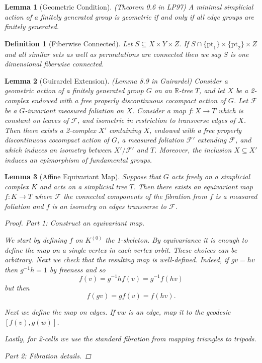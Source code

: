 \documentclass{article}
\theoremstyle{mystyle}
\newtheorem{lem}{Lemma}[section]
\newtheorem{defn}{Definition}
\theoremstyle{remark}
\begin{document}
\begin{lem}
    [Geometric Condition]
    \label{lem:simpgeo} 
    (Theorem 0.6 in LP97)
    A minimal simplicial action of a finitely generated group is geometric if and only if all edge groups are finitely generated.
\end{lem}
\begin{defn}
    [Fiberwise Connected]
    \label{def:connfibers} 
    Let \(S \subseteq X \times Y \times Z\). If \(S \cap \{\text{pt}_1\} \times \{\text{pt}_2\} \times Z\) and all similar sets as well as permutations are connected then we say \(S\) is one dimensional fiberwise connected.
\end{defn}
\begin{lem}
    [Guirardel Extension]
    \label{lem:guirardel-extension}
    (Lemma 8.9 in Guirardel)
    Consider a geometric action of a finitely generated group \(G\) on an \(\mathbb{R}\)-tree \(T\), and let \(X\) be a 2-complex endowed with a free properly discontinuous cocompact action of \(G\). Let \(\mathscr{F}\) be a \(G\)-invariant measured foliation on \(X\). Consider a map \(f: X \to T\) which is constant on leaves of \(\mathscr{F}\), and isometric in restriction to transverse edges of \(X\). Then there exists a 2-complex \( X'\) containing \(X\), endowed with a free properly discontinuous cocompact action of \(G\), a measured foliation \(\mathscr{F} '\) extending \(\mathscr{F}\), and which induces an isometry between \(X'/ \mathscr{F}'\) and \(T\). Moreover, the inclusion \(X \subseteq X'\) induces an epimorphism of fundamental groups.
\end{lem}
\begin{lem}
    [Affine Equivariant Map]
    \label{lem:affineequivariantmap} 
    Suppose that \(G\) acts freely on a simplicial complex \(K\) and acts on a simplicial tree \(T\). Then there exists an equivariant map \(f: K \to T\) where \(\mathscr{F}\) the connected components of the fibration from \(f\) is a measured foliation and \(f\) is an isometry on edges transverse to \(\mathscr{F}\).
    \begin{proof}
        Part 1: Construct an equivariant map.

        We start by defining \(f\) on \(K^{(0)}\) the 1-skeleton. By equivariance it is enough to define the map on a single vertex in each vertex orbit. These choices can be arbitrary. Next we check that the resulting map is well-defined. Indeed, if \(gv=hv\) then \(g^{-1} h = 1\) by freeness and so \[ f(v)=g^{-1}h f(v)=g^{-1} f(hv) \] but then \[ f(gv)=gf(v)=f(hv).\] 
        
        Next we define the map on edges. If \(vw\) is an edge, map it to the geodesic \([f(v),g(w)]\). 
        
        Lastly, for 2-cells we use the standard fibration from mapping triangles to tripods.
        
        Part 2: Fibration details.
    \end{proof}
\end{lem}
\end{document}
